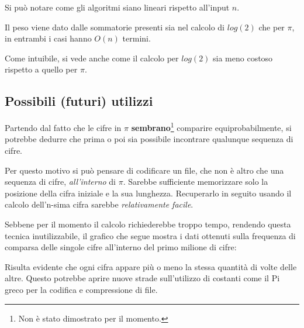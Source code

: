 \noindent Si può notare come gli algoritmi siano lineari rispetto all'input $n$.

Il peso viene dato dalle sommatorie presenti sia nel calcolo di $log(2)$ che per $\pi$, in entrambi i casi hanno $O(n)$ termini.
\newline

Come intuibile, si vede anche come il calcolo per $log(2)$ sia meno costoso rispetto a quello per $\pi$. 

\subsection{Possibili (futuri) utilizzi}
Partendo dal fatto che le cifre in $\pi$ \textbf{sembrano}\footnote{Non è stato dimostrato per il momento.} comparire equiprobabilmente, si potrebbe dedurre che prima o poi sia possibile incontrare qualunque sequenza di cifre.

Per questo motivo si può pensare di codificare un file, che non è altro che una sequenza di cifre, \textit{all'interno} di $\pi$.
Sarebbe sufficiente memorizzare solo la posizione della cifra iniziale e la sua lunghezza. Recuperarlo in seguito usando il calcolo dell'n-sima cifra sarebbe \textit{relativamente facile}.

\noindent Sebbene per il momento il calcolo richiederebbe troppo tempo, rendendo questa tecnica inutilizzabile, il grafico che segue mostra i dati ottenuti sulla frequenza di comparsa delle singole cifre all'interno del primo milione di cifre:
\newline \newline
{}

Risulta evidente che ogni cifra appare più o meno la stessa quantità di volte delle altre. Questo potrebbe aprire nuove strade sull'utilizzo di costanti come il Pi greco per la codifica e compressione di file.